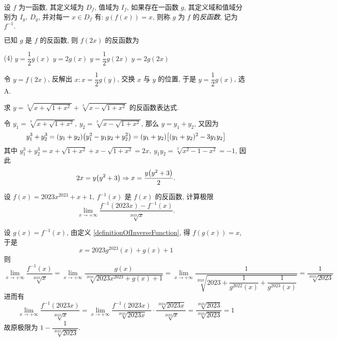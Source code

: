 \begin{definition}[反函数]
    设 $f$ 为一函数, 其定义域为 $D_f$, 值域为 $I_f$, 如果存在一函数 $g$, 其定义域和值域分别为 $I_g,~D_g$, 并对每一 $x\in D_f$ 有:
    $g(f(x))=x$, 则称 $g$ 为 $f$ 的\textit{反函数}, 记为 $f^{-1}.$
    \label{definitionOfInverseFunction}
\end{definition}

\begin{example}
    已知 $g$ 是 $f$ 的反函数, 则 $f(2x)$ 的反函数为
    \begin{tasks}(4)
        \task $y=\dfrac{1}{2}g(x)$
        \task $y=2g(x)$
        \task $y=\dfrac{1}{2}g(2x)$
        \task $y=2g(2x)$
    \end{tasks}
\end{example}
\begin{solution}
    令 $y=f(2x)$, 反解出 $x:x=\dfrac{1}{2}g(y)$, 交换 $x$ 与 $y$ 的位置, 于是 $y=\dfrac{1}{2}g(x)$, 选 A.
\end{solution}

\begin{example}
    求 $y=\sqrt[3]{x+\sqrt{1+x^{2}}}+\sqrt[3]{x-\sqrt{1+x^{2}}}$ 的反函数表达式.
\end{example}
\begin{solution}
    令 $y_1=\sqrt[3]{x+\sqrt{1+x^{2}}},~y_2=\sqrt[3]{x-\sqrt{1+x^{2}}}$, 那么 $y=y_1+y_2$, 又因为
    $$y_1^3+y_2^3=(y_1+y_2)\qty(y_1^2-y_1y_2+y_2^2)=(y_1+y_2)\qty[(y_1+y_2)^2-3y_1y_2]$$
    其中 $y_1^3+y_2^3=x+\sqrt{1+x^2}+x-\sqrt{1+x^2}=2x,~y_1y_2=\sqrt[3]{x^2-1-x^2}=-1$, 因此 $$2x=y\qty(y^2+3)\Rightarrow x=\dfrac{y\qty(y^2+3)}{2}.$$
\end{solution}

\begin{example}
    设 $f(x)=2023x^{2023}+x+1,~f^{-1}(x)$ 是 $f(x)$ 的反函数, 计算极限 $$\lim_{x\to+\infty}\dfrac{f^{-1}(2023x)-f^{-1}(x)}{\sqrt[2023]{x}}.$$
\end{example}
\begin{solution}
    设 $g(x)=f^{-1}(x)$, 由定义 \ref{definitionOfInverseFunction}, 得 $f(g(x))=x$, 于是 $$x=2023 g^{2023}(x)+g(x)+1$$
    则 $$\lim_{x\to+\infty}\dfrac{f^{-1}(x)}{\sqrt[2023]{x}}=\lim_{x\to+\infty}\dfrac{g(x)}{\sqrt[2023]{2023x^{2023}+g(x)+1}}=\lim_{x\to+\infty}\dfrac{1}{\sqrt[2023]{2023+\dfrac{1}{g^{2022}(x)}+\dfrac{1}{g^{2023}(x)}}}=\dfrac{1}{\sqrt[2023]{2023}}$$
    进而有
    $$\lim_{x\to+\infty}\dfrac{f^{-1}(2023x)}{\sqrt[2023]{x}}=\lim_{x\to+\infty}\dfrac{f^{-1}(2023x)}{\sqrt[2023]{2023x}}\cdot\dfrac{\sqrt[2023]{2023x}}{\sqrt[2023]{x}}=\dfrac{\sqrt[2023]{2023}}{\sqrt[2023]{2023}}=1$$
    故原极限为 $1-\dfrac{1}{\sqrt[2023]{2023}}.$
\end{solution}

